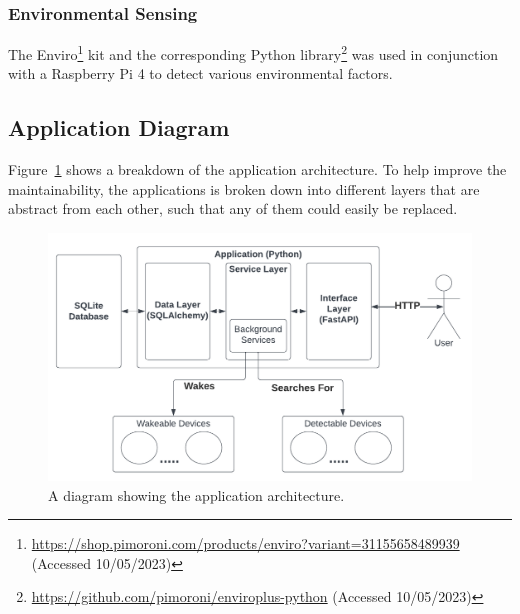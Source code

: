 \vspace{2mm}
\subsubsection{Environmental Sensing}

The Enviro\footnote{\url{https://shop.pimoroni.com/products/enviro?variant=31155658489939} (Accessed 10/05/2023)} kit and the corresponding Python library\footnote{\url{https://github.com/pimoroni/enviroplus-python} (Accessed 10/05/2023)} was used in conjunction with a Raspberry Pi 4 to detect various environmental factors. 

\subsection{Application Diagram}

Figure~\ref{fig:app-architecture} shows a breakdown of the application architecture. To help improve the maintainability, the applications is broken down into different layers that are abstract from each other, such that any of them could easily be replaced.

\begin{figure}[ht]
    \centering
    \includegraphics[width=\columnwidth]{assets/application.png}
    \caption{A diagram showing the application architecture.}
    \label{fig:app-architecture}
\end{figure}